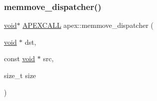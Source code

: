 \subsubsection{\texorpdfstring{memmove\+\_\+dispatcher()}{memmove\_dispatcher()}}
{\footnotesize\ttfamily \mbox{\hyperlink{glad_8h_a950fc91edb4504f62f1c577bf4727c29}{void}}$\ast$ \mbox{\hyperlink{apex__memmove_8h_a6aba84fc57ecd226cfbf8156697e64a5}{A\+P\+E\+X\+C\+A\+LL}} apex\+::memmove\+\_\+dispatcher (\begin{DoxyParamCaption}\item[{\mbox{\hyperlink{glad_8h_a950fc91edb4504f62f1c577bf4727c29}{void}} $\ast$}]{dst,  }\item[{const \mbox{\hyperlink{glad_8h_a950fc91edb4504f62f1c577bf4727c29}{void}} $\ast$}]{src,  }\item[{size\+\_\+t}]{size }\end{DoxyParamCaption})}

